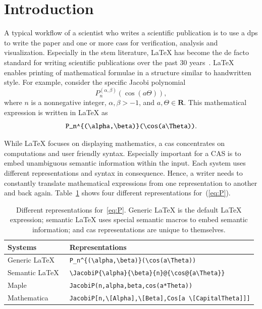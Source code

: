 \documentclass[a4paper,11pt]{article}
\newcommand{\Maple}{Maple}
\newcommand{\Mathematica}{Mathematica}
\theoremstyle{defTheoStyle}
\theoremstyle{defExampStyle}
\begin{document}
\section{Introduction}
A typical workflow of a scientist who writes a scientific publication is to use a \gls*{dps} to write the paper and one or more \glspl*{cas} for verification, analysis and visualization. Especially in the \gls*{stem} literature, \LaTeX{}
has become the de facto standard for writing scientific publications over the past 30 years~\parencites{Knuth}[559]{DigitalTypo}{LATEX:Standard}. \LaTeX{} enables printing of mathematical formulae in a structure similar to handwritten style. For example, consider the specific Jacobi polynomial~\parencite[Table 18.3.1]{NIST:DLMF}
\begin{equation}\label{eq:P}
P_n^{(\alpha , \beta)}(\cos(a\Theta)),
\end{equation}
where $n$ is a nonnegative integer, $\alpha, \beta > -1$, and $a,\Theta\in{\mathbf R}$.
This mathematical expression is written in \LaTeX{} as
\begin{equation*}
\verb|P_n^{(\alpha,\beta)}(\cos(a\Theta))|.
\end{equation*}

While \LaTeX{} focuses on displaying mathematics, a \gls*{cas} concentrates on computations and user friendly syntax. Especially important for a CAS is to embed unambiguous semantic information within the input. Each system uses different representations and syntax in consequence. Hence, a writer needs to constantly translate mathematical expressions from one representation to another and back again. Table~\ref{tab:JacobiP-usecase} shows four different representations for~(\ref{eq:P}).

\begin{table}[ht]
	\centering
	\begin{tabular}{ll}
		\hline
		Systems & Representations \\
		\hline
		\hline
		Generic \LaTeX\ & \verb|P_n^{(\alpha,\beta)}(\cos(a\Theta))| \\ 
		Semantic \LaTeX\ & \verb|\JacobiP{\alpha}{\beta}{n}@{\cos@{a\Theta}}| \\
		\Maple & \verb|JacobiP(n,alpha,beta,cos(a*Theta))| \\ 
		\Mathematica & \verb|JacobiP[n,\[Alpha],\[Beta],Cos[a \[CapitalTheta]]]|\\
		\hline
	\end{tabular}
	\caption{Different representations for~\eqref{eq:P}. Generic \LaTeX{} is the default \LaTeX{} expression; semantic \LaTeX{} uses special semantic macros to embed semantic information; and \gls*{cas} representations are unique to themselves.}
	\label{tab:JacobiP-usecase}
\end{table}
\end{document}
